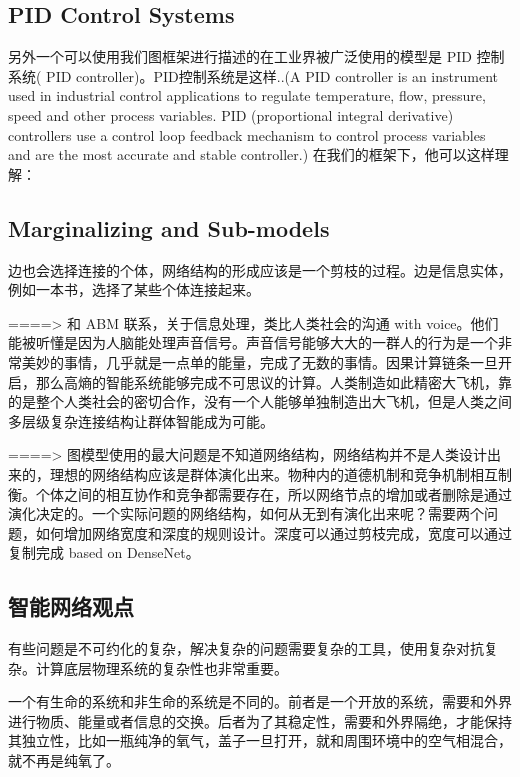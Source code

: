 \documentclass[10pt,onecolumn,letterpaper]{article}
\begin{document}
\begin{CJK*}{UTF8}{gbsn}
\subsection{PID Control Systems}

另外一个可以使用我们图框架进行描述的在工业界被广泛使用的模型是 PID 控制系统( PID controller)。PID控制系统是这样..(A PID controller is an instrument used in industrial control applications to regulate temperature, flow, pressure, speed and other process variables. PID (proportional integral derivative) controllers use a control loop feedback mechanism to control process variables and are the most accurate and stable controller.)
在我们的框架下，他可以这样理解：









\subsection{Marginalizing and Sub-models}

边也会选择连接的个体，网络结构的形成应该是一个剪枝的过程。边是信息实体，例如一本书，选择了某些个体连接起来。


====> 和 ABM 联系，关于信息处理，类比人类社会的沟通 with voice。他们能被听懂是因为人脑能处理声音信号。声音信号能够大大的一群人的行为是一个非常美妙的事情，几乎就是一点单的能量，完成了无数的事情。因果计算链条一旦开启，那么高熵的智能系统能够完成不可思议的计算。人类制造如此精密大飞机，靠的是整个人类社会的密切合作，没有一个人能够单独制造出大飞机，但是人类之间多层级复杂连接结构让群体智能成为可能。


====> 图模型使用的最大问题是不知道网络结构，网络结构并不是人类设计出来的，理想的网络结构应该是群体演化出来。物种内的道德机制和竞争机制相互制衡。个体之间的相互协作和竞争都需要存在，所以网络节点的增加或者删除是通过演化决定的。一个实际问题的网络结构，如何从无到有演化出来呢？需要两个问题，如何增加网络宽度和深度的规则设计。深度可以通过剪枝完成，宽度可以通过复制完成 based on DenseNet。




\subsection{智能网络观点}

有些问题是不可约化的复杂，解决复杂的问题需要复杂的工具，使用复杂对抗复杂。计算底层物理系统的复杂性也非常重要。

一个有生命的系统和非生命的系统是不同的。前者是一个开放的系统，需要和外界进行物质、能量或者信息的交换。后者为了其稳定性，需要和外界隔绝，才能保持其独立性，比如一瓶纯净的氧气，盖子一旦打开，就和周围环境中的空气相混合，就不再是纯氧了。


\end{CJK*}
\end{document}
